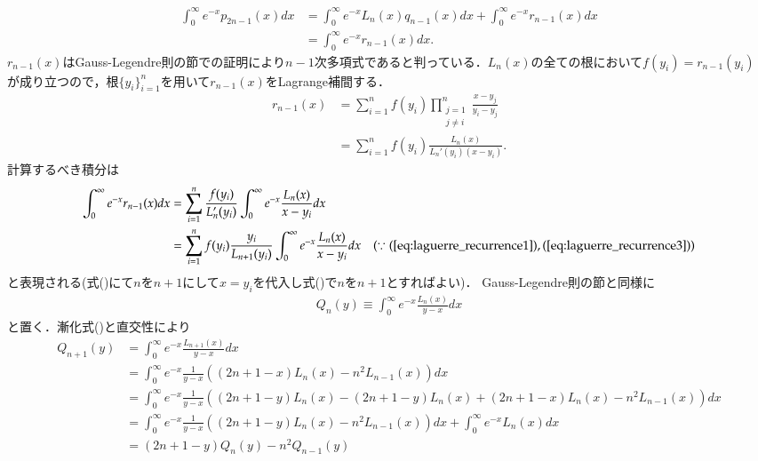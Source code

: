 \documentclass[a4j,papersize,disablejfam,slide,14pt]{jsarticle}
\def\exp#1{e^{#1}} %
\begin{document}
    \begin{align}
    	\int_{0}^{\infty} \exp{-x}p_{2n-1}(x) dx &= \int_{0}^{\infty} \exp{-x}L_n(x)q_{n-1}(x) dx + \int_{0}^{\infty} \exp{-x}r_{n-1}(x) dx \\
        &= \int_{0}^{\infty} \exp{-x}r_{n-1}(x) dx.
    \end{align}
    $r_{n-1}(x)$は{\rm Gauss-Legendre}則の節での証明により$n-1$次多項式であると判っている．$L_n(x)$の全ての根において$f(y_i)=r_{n-1}(y_i)$
    が成り立つので，根$\{y_i\}_{i=1}^{n}$を用いて$r_{n-1}(x)$を{\rm Lagrange}補間する．
    \begin{align}
    	r_{n-1}(x) &= \sum_{i=1}^{n} f(y_i) \prod_{\substack{j=1 \\ j \neq i}}^{n} \frac{x-y_j}{y_i-y_j} \\
        &= \sum_{i=1}^{n} f(y_i) \frac{L_n(x)}{L_n'(y_i)(x-y_i)}.
    \end{align}
    計算するべき積分は
    \begin{align}
    	\int_{0}^{\infty} \exp{-x}r_{n-1}(x) dx &= \sum_{i=1}^{n} \frac{f(y_i)}{L_n'(y_i)} \int_{0}^{\infty} \exp{-x} \frac{L_n(x)}{x-y_i}dx \\
        &= \sum_{i=1}^{n} f(y_i) \frac{y_i}{L_{n+1}(y_i)} \int_{0}^{\infty} \exp{-x} \frac{L_n(x)}{x-y_i}dx 
        	& (\because (\refeq{eq:laguerre_recurrence1}),(\refeq{eq:laguerre_recurrence3}))
    \end{align}
    と表現される(式()にて$n$を$n+1$にして$x=y_i$を代入し式()で$n$を$n+1$とすればよい)．
    {\rm Gauss-Legendre}則の節と同様に
    \begin{align}
    	Q_n(y) \equiv \int_{0}^{\infty} \exp{-x} \frac{L_n(x)}{y-x} dx
    \end{align}
    と置く．漸化式()と直交性により
    \begin{align}
    	Q_{n+1}(y) &= \int_{0}^{\infty} \exp{-x} \frac{L_{n+1}(x)}{y-x} dx \\
        &= \int_{0}^{\infty} \exp{-x} \frac{1}{y-x} \left( (2n+1-x)L_n(x) - n^2L_{n-1}(x) \right) dx \\
        &= \int_{0}^{\infty} \exp{-x} \frac{1}{y-x} \left( (2n+1-y)L_n(x) - (2n+1-y)L_n(x) + (2n+1-x)L_n(x) - n^2L_{n-1}(x) \right) dx \\
        &= \int_{0}^{\infty} \exp{-x} \frac{1}{y-x} \left( (2n+1-y)L_n(x) - n^2L_{n-1}(x) \right) dx + \int_{0}^{\infty} \exp{-x} L_n(x) dx \\
        &= (2n+1-y)Q_n(y) - n^2Q_{n-1}(y)
    \end{align}
\end{document}
